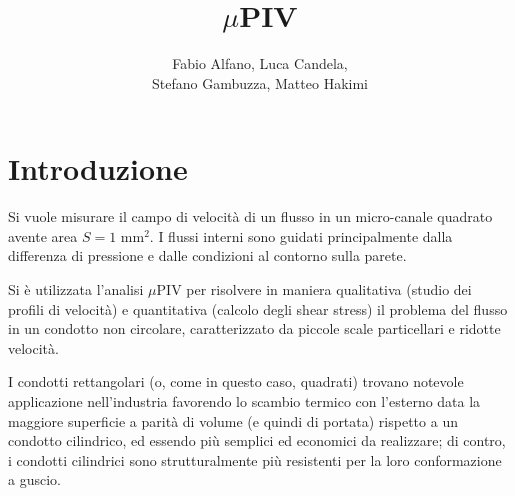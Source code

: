 \documentclass{article} %
\begin{document}
\title{\huge $\mu$PIV}
\author{Fabio Alfano, Luca Candela,\\Stefano Gambuzza, Matteo Hakimi}
\date{}
\maketitle
\newpage
\tableofcontents
\newpage

\section{Introduzione}
Si vuole misurare il campo di velocità di un flusso in un micro-canale quadrato avente area $S = 1$ mm$^{2}$. I flussi interni sono guidati principalmente dalla differenza di pressione e dalle condizioni al contorno sulla parete.\par
Si è utilizzata l'analisi $\mu$PIV per risolvere in maniera qualitativa (studio dei profili di velocità) e quantitativa (calcolo degli shear stress) il problema del flusso in un condotto non circolare, caratterizzato da piccole scale particellari e ridotte velocità.\par
I condotti rettangolari (o, come in questo caso, quadrati) trovano notevole applicazione nell'industria favorendo lo scambio termico con l'esterno data la maggiore superficie a parità di volume (e quindi di portata) rispetto a un condotto cilindrico, ed essendo più semplici ed economici da realizzare; di contro, i condotti cilindrici sono strutturalmente più resistenti per la loro conformazione a guscio.\par
\end{document}

